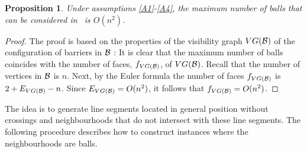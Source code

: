 \documentclass[a4paper,  review, authoryear, 1p.]{elsarticle}
\newcommand{\TSPN}{{\sf{H-TSPN}\xspace }}
\newtheorem{prop}{Proposition}
\newcommand{\JP}[1]{{\color{armygreen}#1}}
\newcommand{\CV}[1]{{\color{atomictangerine}#1}}
\begin{document}
	
	
	\begin{prop}
		Under assumptions \ref{A1}-\ref{A4}, the maximum number of balls that can be considered in \TSPN \ is $O(n^2)$.
	\end{prop}
	\begin{proof}
		The proof is based on the properties of the visibility graph $VG(\cal B)$ of the configuration of barriers in $\cal B$ \citep{mitchell_shortest_2017}:  It is clear that the maximum number of balls coincides with the number of faces, $f_{VG(\cal B)}$, of $VG(\cal B)$.  Recall that the number of vertices in $\cal B$ is $n$. Next, by the Euler formula the number of faces $f_{VG(\cal B)}$ is $2+E_{VG(\cal B)}-n$. Since $E_{VG(\cal B)}=O(n^2)$, it follows that $f_{VG(\cal B)}=O(n^2)$.
	\end{proof}
	
	
	The idea is to generate line segments located in general position without crossings and neighbourhoods that do not intersect with these line segments. The following procedure describes how to construct instances where the neighbourhoods are balls.
	
\end{document}
